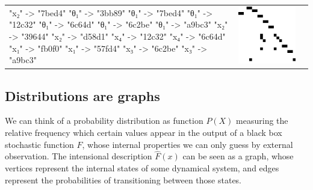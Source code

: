 \documentclass[11pt]{article}
\begin{document}
\begin{table}[H]
\begin{tabular}{lcc}
\begin{adjustbox}{minipage={.25\textwidth}, height=0.14\textwidth, margin*=0cm 0cm 0cm 0.1cm}
{    "x₂" -> "7bed4"
    "θ₁" -> "3bb89"
    "θ₁" -> "7bed4"
    "θ₁" -> "12c32"
    "θ₁" -> "6c64d"
    "θ₁" -> "6c2be"
    "θ₁" -> "a9bc3"
    "x₂" -> "39644"
    "x₂" -> "d58d1"
    "x₄" -> "12c32"
    "x₄" -> "6c64d"
    "x₁" -> "fb0f0"
    "x₁" -> "57fd4"
    "x₃" -> "6c2be"
    "x₃" -> "a9bc3"
    } \end{adjustbox} &
            \begin{adjustbox}{minipage={.15\textwidth}, height=0.14\textwidth, margin*=-0.2cm 0cm 0cm 0.5cm}
            \includegraphics[scale=0.15]{../../clipart/adj_prog.png}
            \end{adjustbox}
        \end{tabular}
    \end{table}
    \egroup

    \pagebreak\subsection{Distributions are graphs}\label{sec:distributions-graphs}

    We can think of a probability distribution as function $P(X)$ measuring the relative frequency which certain values appear in the output of a black box stochastic function $F$, whose internal properties we can only guess by external observation. The intensional description $\hat F(x)$ can be seen as a graph, whose vertices represent the internal states of some dynamical system, and edges represent the probabilities of transitioning between those states.
\end{document}
